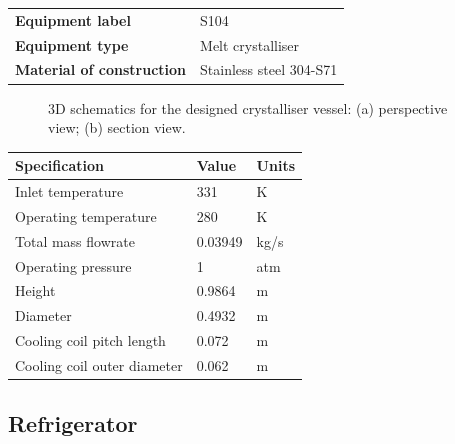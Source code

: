 \begin{table}[H]
    \centering
    \begin{tabular}{@{}l|l@{}}
    \toprule
      \textbf{Equipment label}  & S104\\
       \textbf{Equipment type}  & Melt crystalliser \\
       \textbf{Material of construction} & Stainless steel 304-S71 \\
       \bottomrule
    \end{tabular}
\end{table}


\begin{figure}[H]
    \centering
    
    \caption{3D schematics for the designed crystalliser vessel: (a) perspective view; (b) section view.}
    \label{fig:schematic wash column process design data sheet}
\end{figure}

\begin{table}[H]
\centering
\begin{tabular}{@{}l|l|l@{}}
\toprule
\textbf{Specification}                  & \textbf{Value} & \textbf{Units}    \\ \midrule
Inlet temperature                       & 331             & K                \\ \midrule
Operating temperature                   & 280             & K                \\ \midrule
Total mass  flowrate                    & 0.03949         & kg/s             \\ \midrule
Operating pressure                      & 1               & atm               \\ \midrule
Height                                  & 0.9864          & m                 \\ \midrule
Diameter                                & 0.4932          & m                 \\ \midrule
Cooling coil pitch length               & 0.072           & m                 \\ \midrule
Cooling coil outer diameter             & 0.062           & m                  \\ \bottomrule
\end{tabular}
\end{table}
\newpage
\subsection{Refrigerator}

